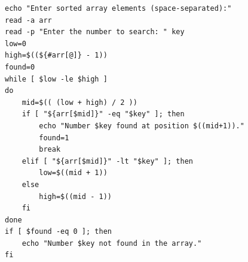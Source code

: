\begin{verbatim}
echo "Enter sorted array elements (space-separated):"
read -a arr
read -p "Enter the number to search: " key
low=0
high=$((${#arr[@]} - 1))
found=0
while [ $low -le $high ]
do
    mid=$(( (low + high) / 2 ))
    if [ "${arr[$mid]}" -eq "$key" ]; then
        echo "Number $key found at position $((mid+1))."
        found=1
        break
    elif [ "${arr[$mid]}" -lt "$key" ]; then
        low=$((mid + 1))
    else
        high=$((mid - 1))
    fi
done
if [ $found -eq 0 ]; then
    echo "Number $key not found in the array."
fi
\end{verbatim}